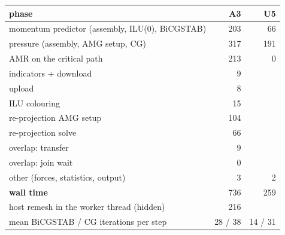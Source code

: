 \begin{tabular}{lrr}
\toprule
phase & A3 & U5 \\
\midrule
momentum predictor (assembly, ILU(0), BiCGSTAB) & 203 & 66 \\
pressure (assembly, AMG setup, CG) & 317 & 191 \\
AMR on the critical path & 213 & 0 \\
\quad indicators + download & 9 &  \\
\quad upload & 8 &  \\
\quad ILU colouring & 15 &  \\
\quad re-projection AMG setup & 104 &  \\
\quad re-projection solve & 66 &  \\
\quad overlap: transfer & 9 &  \\
\quad overlap: join wait & 0 &  \\
other (forces, statistics, output) & 3 & 2 \\
\textbf{wall time} & 736 & 259 \\
\midrule
host remesh in the worker thread (hidden) & 216 & \\
mean BiCGSTAB / CG iterations per step & 28 / 38 & 14 / 31 \\
\bottomrule
\end{tabular}
